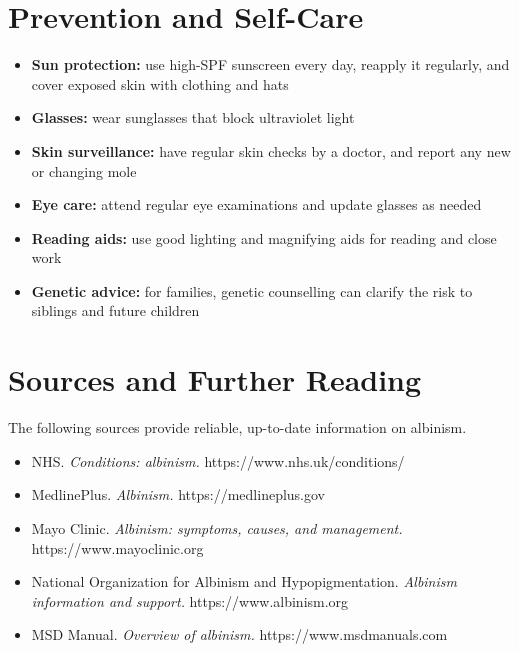 \section*{Prevention and Self-Care}
\begin{itemize}
    \item \textbf{Sun protection:} use high-SPF sunscreen every day, reapply it regularly, and cover exposed skin with clothing and hats
    \item \textbf{Glasses:} wear sunglasses that block ultraviolet light
    \item \textbf{Skin surveillance:} have regular skin checks by a doctor, and report any new or changing mole
    \item \textbf{Eye care:} attend regular eye examinations and update glasses as needed
    \item \textbf{Reading aids:} use good lighting and magnifying aids for reading and close work
    \item \textbf{Genetic advice:} for families, genetic counselling can clarify the risk to siblings and future children
\end{itemize}

\section*{Sources and Further Reading}
The following sources provide reliable, up-to-date information on albinism.

\begin{itemize}
    \item NHS. \textit{Conditions: albinism.} https://www.nhs.uk/conditions/
    \item MedlinePlus. \textit{Albinism.} https://medlineplus.gov
    \item Mayo Clinic. \textit{Albinism: symptoms, causes, and management.} https://www.mayoclinic.org
    \item National Organization for Albinism and Hypopigmentation. \textit{Albinism information and support.} https://www.albinism.org
    \item MSD Manual. \textit{Overview of albinism.} https://www.msdmanuals.com
\end{itemize}
